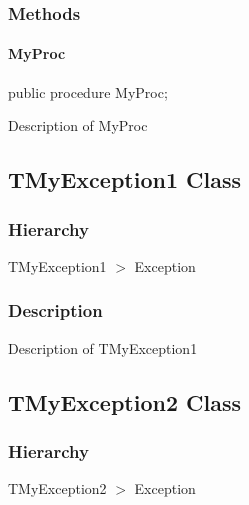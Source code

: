 \documentclass{report}
\begin{document}
\subsubsection*{\large{\textbf{Methods}}\normalsize\hspace{1ex}\hfill}
\paragraph*{MyProc}\hspace*{\fill}

\begin{list}{}{
\setlength{\itemindent}{0cm}
\setlength{\listparindent}{0cm}
\setlength{\leftmargin}{\evensidemargin}
\addtolength{\leftmargin}{\tmplength}
\settowidth{\labelsep}{X}
\addtolength{\leftmargin}{\labelsep}
\setlength{\labelwidth}{\tmplength}
}
\begin{flushleft}
\item[\textbf{Declaration}\hfill]
\begin{ttfamily}
public procedure MyProc;\end{ttfamily}


\end{flushleft}
\par
\item[\textbf{Description}]
Description of MyProc

\end{list}
\subsection*{TMyException1 Class}
\subsubsection*{\large{\textbf{Hierarchy}}\normalsize\hspace{1ex}\hfill}
TMyException1 {$>$} Exception
\subsubsection*{\large{\textbf{Description}}\normalsize\hspace{1ex}\hfill}
Description of TMyException1\subsection*{TMyException2 Class}
\subsubsection*{\large{\textbf{Hierarchy}}\normalsize\hspace{1ex}\hfill}
TMyException2 {$>$} Exception
\end{document}
